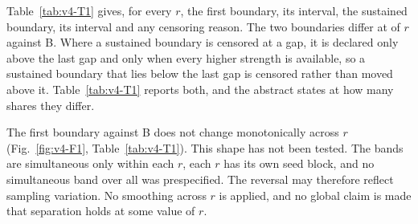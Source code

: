 Table~\ref{tab:v4-T1} gives, for every $r$, the first boundary, its interval, the sustained boundary, its interval and any censoring reason. %
The two boundaries differ at   of $r$ against B. %
Where a sustained boundary is censored at a gap, it is declared only above the last gap and only when every higher strength is available, so a sustained boundary that lies below the last gap is censored rather than moved above it. %
Table~\ref{tab:v4-T1} reports both, and the abstract states at how many shares they differ. %


The first boundary against B does not change monotonically across $r$ (Fig.~\ref{fig:v4-F1}, Table~\ref{tab:v4-T1}). %
This shape has not been tested. The bands are simultaneous only within each $r$, each $r$ has its own seed block, and no simultaneous band over all   was prespecified. The reversal may therefore reflect sampling variation. %
No smoothing across $r$ is applied, and no global claim is made that separation holds at some value of $r$. %


